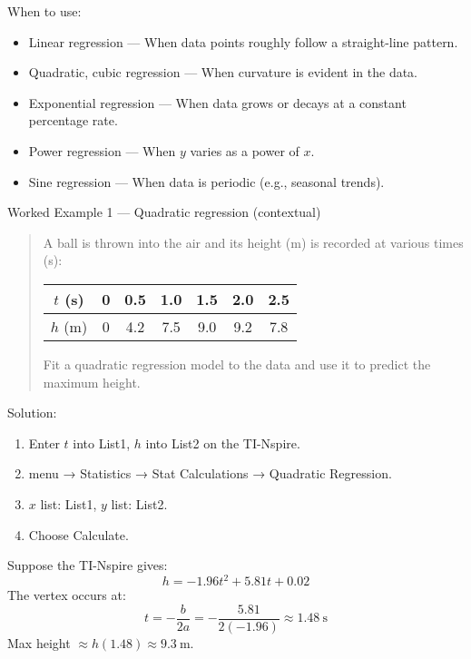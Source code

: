 \documentclass[11pt]{article}
\def\textbf#1{#1}%
\def\texttt#1{#1}%
\begin{document}
\textbf{When to use:}
\begin{itemize}
    \item \textbf{Linear regression} — When data points roughly follow a straight-line pattern.
    \item \textbf{Quadratic, cubic regression} — When curvature is evident in the data.
    \item \textbf{Exponential regression} — When data grows or decays at a constant percentage rate.
    \item \textbf{Power regression} — When $y$ varies as a power of $x$.
    \item \textbf{Sine regression} — When data is periodic (e.g., seasonal trends).
\end{itemize}

\textbf{Worked Example 1 — Quadratic regression (contextual)}
\begin{quote}
A ball is thrown into the air and its height (m) is recorded at various times (s):

\begin{center}
\begin{tabular}{c|cccccc}
$t$ (s) & 0 & 0.5 & 1.0 & 1.5 & 2.0 & 2.5 \\
\hline
$h$ (m) & 0 & 4.2 & 7.5 & 9.0 & 9.2 & 7.8 \\
\end{tabular}
\end{center}

Fit a quadratic regression model to the data and use it to predict the maximum height.
\end{quote}

\textbf{Solution:}
\begin{enumerate}
    \item Enter $t$ into \texttt{List1}, $h$ into \texttt{List2} on the TI-Nspire.
    \item \texttt{menu} → \texttt{Statistics} → \texttt{Stat Calculations} → \texttt{Quadratic Regression}.
    \item $x$ list: \texttt{List1}, $y$ list: \texttt{List2}.
    \item Choose \texttt{Calculate}.
\end{enumerate}
Suppose the TI-Nspire gives:
\[
h = -1.96t^2 + 5.81t + 0.02
\]
The vertex occurs at:
\[
t = -\frac{b}{2a} = -\frac{5.81}{2(-1.96)} \approx 1.48\ \text{s}
\]
Max height $\approx h(1.48) \approx 9.3\ \text{m}$.
\end{document}

